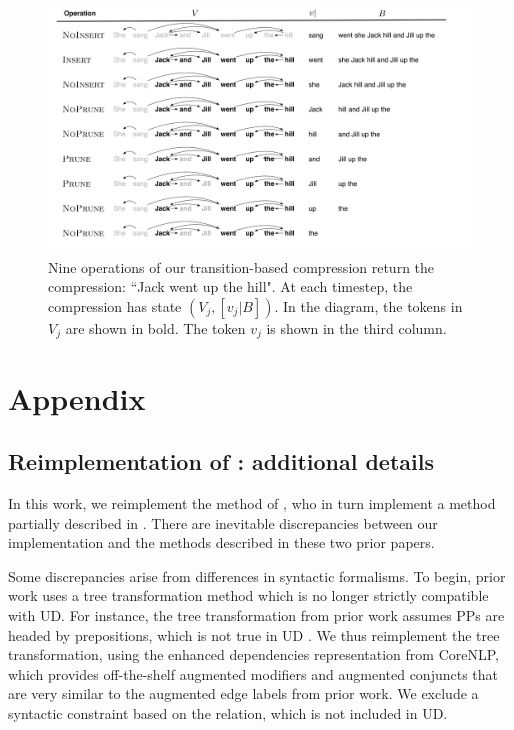 \appendix

\begin{figure}[htb!]
\centering
\includegraphics[width=.75\textwidth]{worked.pdf}
\caption{Nine operations of our transition-based compression return the compression: ``Jack went up the hill". At each timestep, the compression has state $(V_j, [v_j|B])$. In the diagram, the tokens in $V_j$ are shown in bold. The token $v_j$ is shown in the third column.}
\label{f:example}
\end{figure}

\section{Appendix}


\subsection{Reimplementation of \citet{filippova2013overcoming}: additional details}

In this work, we reimplement the method of \citet{filippova2013overcoming}, who in turn implement a method partially described in \citet{filippova2008dependency}.  There are inevitable discrepancies between our implementation and the methods described in these two prior papers.  

Some discrepancies arise from differences in syntactic formalisms. To begin, prior work uses a tree transformation method which is no longer strictly compatible with UD. For instance, the tree transformation from prior work assumes PPs are headed by prepositions, which is not true in UD \cite{Schuster2016EnhancedEU}. We thus reimplement the tree transformation, using the enhanced dependencies representation from CoreNLP, which provides off-the-shelf augmented modifiers and augmented conjuncts that are very similar to the augmented edge labels from prior work. We exclude a syntactic constraint based on the  relation, which is not included in UD.

